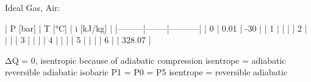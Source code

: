 Ideal Gas, Air:

| P [bar] | T [°C] | i [kJ/kg] |
|---------|--------|-----------|
| 0       | 0.01   | -30       |
| 1       |        |           |
| 2       |        |           |
| 3       |        |           |
| 4       |        |           |
| 5       |        |           |
| 6       |        | 328.07    |

ΔQ = 0, isentropic because of adiabatic compression  
isentrope = adiabatic reversible  
adiabatic  
isobaric P1 = P0 = P5  
isentrope = reversible adiabatic